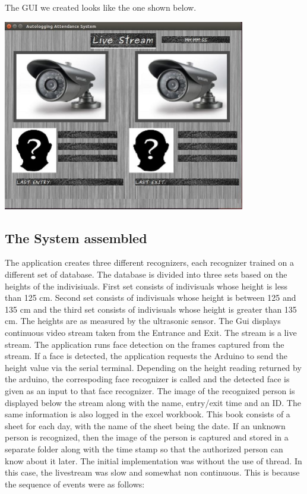 \documentclass[a4paper,12pt]{article}
\begin{document}
The GUI we created looks like the one shown below. 

\includegraphics[width = 300pt]{guioapp}

\vspace{1cm}

\subsection{The System assembled}
The application creates three different recognizers, 
each recognizer trained on a different set of database. The database is divided into three sets based on the heights of the indivisiuals.
First set consists of indivisuals whose height is less than 125 cm. Second set consists of indivisuals whose height is between 125 and 135 
cm and the third set consists of indivisuals whose height is greater than 135 cm. The heights are as measured by the ultrasonic sensor.
\newline The Gui displays continuous video stream taken from the Entrance and Exit.
The stream is a live stream. The application runs face detection on the frames captured from the stream. If a face is detected, the
application requests the Arduino to send the height value via the serial terminal. 
Depending on the height reading returned by the arduino, the correspoding face recognizer is called and the detected face is given as
an input to that face recognizer. The image of the recognized person is displayed below the stream along with the name, entry/exit time 
and an ID. The same information is also logged in the excel workbook. This book consists of a sheet for each day, with the name of the 
sheet being the date.
\newline If an unknown person is recognized, then the image of the person is captured and stored in a separate folder along with 
the time stamp so that the authorized person can know about it later.
\newline The initial implementation was without the use of thread. In this case, the livestream was slow and somewhat non continuous. 
This is because the sequence of events were as follows:
\end{document}
